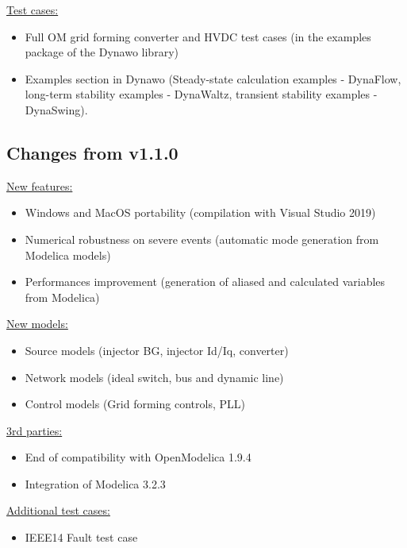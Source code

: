 \documentclass[a4paper, 12pt]{report}
\begin{document}
\underline{Test cases:}
\begin{itemize}
\item Full OM grid forming converter and HVDC test cases (in the examples package of the Dynawo library)
\item Examples section in Dynawo (Steady-state calculation examples - DynaFlow, long-term stability examples - DynaWaltz, transient stability examples - DynaSwing).
\end{itemize}

\subsection{Changes from v1.1.0}

\underline{New features:}
\begin{itemize}
\item Windows and MacOS portability (compilation with Visual Studio 2019)
\item Numerical robustness on severe events (automatic mode generation from Modelica models)
\item Performances improvement (generation of aliased and calculated variables from Modelica)
\end{itemize}

\underline{New models:}
\begin{itemize}
\item Source models (injector BG, injector Id/Iq, converter)
\item Network models (ideal switch, bus and dynamic line)
\item Control models (Grid forming controls, PLL)
\end{itemize}

\underline{3rd parties:}
\begin{itemize}
\item End of compatibility with OpenModelica 1.9.4
\item Integration of Modelica 3.2.3
\end{itemize}

\underline{Additional test cases:}
\begin{itemize}
\item IEEE14 Fault test case
\end{itemize}
\end{document}
